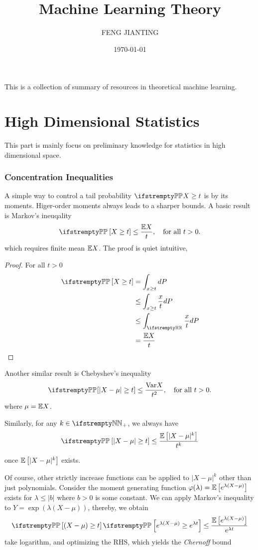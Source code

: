 \documentclass{paper}
\title{Machine Learning Theory}
\author{FENG JIANTING}
\date{\today}
\begin{document}
\maketitle
This is a collection of summary of resources in theoretical machine learning. ~\cite{NIPS2007_013a006f}
\tableofcontents
\part{High Dimensional Statistics}
This part is mainly focus on preliminary knowledge for statistics in high dimensional space.
\section{Concentration Inequalities}
A simple way to control a tail probability $\PP{X}\geq t$ is by its moments. Higer-order moments always leads to a sharper bounds. A basic result is Markov's ineuqality
\[
	\PP \left[X\geq t\right] \leq \frac{\EE X}{t}, \quad \text{for all } t > 0.
\]
which requires finite mean $\mathbb{E}{X}$. The proof is quiet intuitive,
\begin{proof}
	For all $t > 0$
	\begin{align}
		\PP\left[X\geq t\right] & = \int_{x\geq t} dP               \\
		                        & \leq \int_{x\geq t} \frac{x}{t}dP \\
		                        & \leq\int_{\RR}\frac{x}{t}dP       \\
		                        & = \frac{\EE X}{t}
	\end{align}
\end{proof}

Another similar result is Chebyshev's inequality
\[
	\PP{\left[\vert X-\mu\vert \geq t\right]} \leq \frac{\var{X}}{t^2}, \quad \text{for all } t > 0.
\]
where $\mu=\mathbb{E} X$.

Similarly, for any $k\in \NN_+$, we always have
\[
	\PP\left[\vert X-\mu\vert\geq t\right] \leq \frac{\EE\left[\vert X-\mu\vert^k\right]}{t^k}
\]

once $\mathbb{E}\left[\vert X-\mu\vert^k\right]$ exists.

Of course, other strictly increase functions can be applied to $\vert X-\mu\vert ^k$ other than just polynomials.
Consider the moment generating function $\varphi(\lambda) = \mathbb{E} \left[e^{\lambda(X-\mu)}\right]$ exists for $\lambda \leq \vert b\vert$ where $b>0$ is some constant.
We can apply Markov's inequality to $Y = \exp(\lambda (X-\mu))$, thereby, we obtain
\[
	\PP\left[(X-\mu)\geq t\right] \PP\left[e^{\lambda(X-\mu)}\geq e^{\lambda t}\right] \leq \frac{\EE\left[e^{\lambda(X-\mu)}\right]}{e^{\lambda t}}
\]
take logarithm, and optimizing the RHS, which yields the \textit{Chernoff} bound
\end{document}

